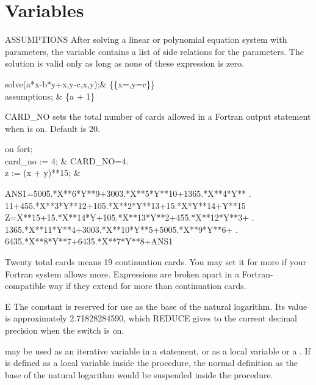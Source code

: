 \section{Variables}

\begin{Variable}[assumptions]{ASSUMPTIONS}
After solving a linear or polynomial equation system
with parameters, the variable  contains a list 
of side relations for the parameters. The solution is valid only
as long as none of these expression is zero.
\begin{Examples}
solve({a*x-b*y+x,y-c},{x,y});&
\{\{x=,y=c\}\} \\
assumptions; & \{a + 1\}
\end{Examples}
\end{Variable}


\begin{Variable}[card_no]{CARD_NO}
 sets the total number of cards allowed in a Fortran
output statement when  is on.  Default is 20.

\begin{Examples}
on fort; \\
card_no := 4;                &         CARD_NO=4. \\
z := (x + y)**15;            &
\begin{multilineoutput}{6cm}
      ANS1=5005.*X**6*Y**9+3003.*X**5*Y**10+1365.*X**4*Y**
     . 11+455.*X**3*Y**12+105.*X**2*Y**13+15.*X*Y**14+Y**15
      Z=X**15+15.*X**14*Y+105.*X**13*Y**2+455.*X**12*Y**3+ 
     . 1365.*X**11*Y**4+3003.*X**10*Y**5+5005.*X**9*Y**6+
     . 6435.*X**8*Y**7+6435.*X**7*Y**8+ANS1
\end{multilineoutput}
\end{Examples}

\begin{Comments}
Twenty total cards means 19 continuation cards.  You may set it for more
if your Fortran system allows more.  Expressions are broken apart in a
Fortran-compatible way if they extend for more than 
continuation cards.
\end{Comments}
\end{Variable}


\begin{Constant}[e]{E}
The constant  is reserved for use as the base of the natural
logarithm.  Its value is approximately 2.71828284590, which REDUCE gives
to the current decimal precision when the switch  is on.

\begin{Comments}
 may be used as an iterative variable in a  statement,
or as a local variable or a .  If  is defined
as a local
variable inside the procedure, the normal definition as the base of the
natural logarithm would be suspended inside the procedure.
\end{Comments}
\end{Constant}


